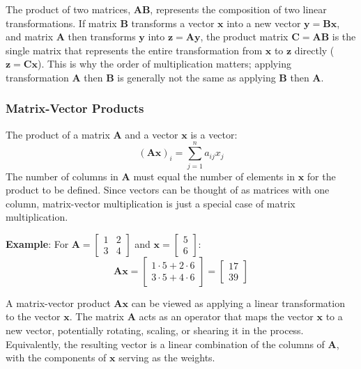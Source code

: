The product of two matrices, $ \mathbf{A}\mathbf{B} $, represents the composition of two linear transformations. If matrix $ \mathbf{B} $ transforms a vector $ \mathbf{x} $ into a new vector $ \mathbf{y} = \mathbf{B}\mathbf{x} $, and matrix $ \mathbf{A} $ then transforms $ \mathbf{y} $ into $ \mathbf{z} = \mathbf{A}\mathbf{y} $, the product matrix $ \mathbf{C} = \mathbf{A}\mathbf{B} $ is the single matrix that represents the entire transformation from $ \mathbf{x} $ to $ \mathbf{z} $ directly ($ \mathbf{z} = \mathbf{C}\mathbf{x} $). This is why the order of multiplication matters; applying transformation $ \mathbf{A} $ then $ \mathbf{B} $ is generally not the same as applying $ \mathbf{B} $ then $ \mathbf{A} $.

\subsubsection{Matrix-Vector Products}
The product of a matrix $ \mathbf{A} $ and a vector $ \mathbf{x} $ is a vector:
\begin{equation*}
    (\mathbf{A}\mathbf{x})_i = \sum_{j=1}^n a_{ij} x_j
\end{equation*}
The number of columns in $ \mathbf{A} $ must equal the number of elements in $ \mathbf{x} $ for the product to be defined. Since vectors can be thought of as matrices with one column, matrix-vector multiplication is just a special case of matrix multiplication.

\begin{exampleBox}
    \textbf{Example}: For $ \mathbf{A} = \begin{bmatrix}1 & 2\\3 & 4\end{bmatrix} $ and $ \mathbf{x} = \begin{bmatrix}5 \\ 6\end{bmatrix} $:
    \begin{equation*}
        \mathbf{A}\mathbf{x} = \begin{bmatrix}1 \cdot 5 + 2 \cdot 6 \\ 3 \cdot 5 + 4 \cdot 6\end{bmatrix} = \begin{bmatrix}17 \\ 39\end{bmatrix}
    \end{equation*}
\end{exampleBox}

A matrix-vector product $ \mathbf{A}\mathbf{x} $ can be viewed as applying a linear transformation to the vector $ \mathbf{x} $. The matrix $ \mathbf{A} $ acts as an operator that maps the vector $ \mathbf{x} $ to a new vector, potentially rotating, scaling, or shearing it in the process. Equivalently, the resulting vector is a linear combination of the columns of $ \mathbf{A} $, with the components of $ \mathbf{x} $ serving as the weights.

